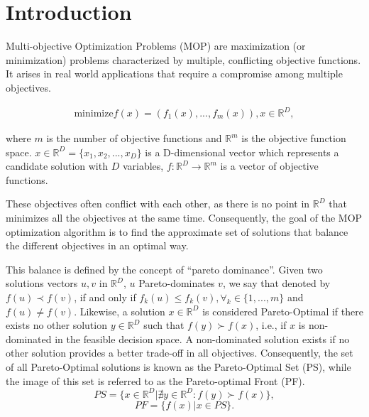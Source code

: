 \section{Introduction}

Multi-objective Optimization Problems (MOP) are maximization (or minimization) problems characterized by multiple, conflicting objective functions. It arises in real world applications that require a compromise among multiple objectives.



\vspace{-1em}
\begin{align}\label{min_problem}
\text{minimize} f(x) = (f_1(x), ..., f_{m}(x)), \text{$x \in \mathbb{R}^{D}$},
\end{align}

where $m$ is the number of objective functions and $\mathbb{R}^m$ is the objective function space. $x \in \mathbb{R}^{D} = \{x_1, x_2, ..., x_D\}$ is a D-dimensional vector which represents a candidate solution with ${D}$ variables, $f: \mathbb{R}^{D} \rightarrow \mathbb{R}^{m}$ is a vector of objective functions.

These objectives often conflict with each other, as there is no point in $\mathbb{R}^{D}$ that minimizes all the objectives at the same time. Consequently, the goal of the MOP optimization algorithm is to find the approximate set of solutions that balance the different objectives in an optimal way.

This balance is defined by the concept of ``pareto dominance''. Given two solutions vectors $u, v$ in $\mathbb{R}^{D}$, $u$  Pareto-dominates $v$, we say that denoted by $f(u) \prec f(v)$, if and only if $f_k(u) \leq f_k(v), \forall_k \in \{1,..., m\}$ and $ f(u) \neq f(v)$. Likewise, a solution $x \in \mathbb{R}^{D}$ is considered Pareto-Optimal if there exists no other solution $y \in \mathbb{R}^{D}$ such that $f(y) \succ f(x)$, i.e., if $x$ is non-dominated in the feasible decision space. A non-dominated solution exists if no other solution provides a better trade-off in all objectives. Consequently, the set of all Pareto-Optimal solutions is known as the Pareto-Optimal Set (PS), while the image of this set is referred to as the Pareto-optimal Front (PF).%
\begin{equation}
PS = \{x \in \mathbb{R}^{D} | \nexists y \in \mathbb{R}^{D} : f(y) \succ f(x)  \},
\end{equation}
\begin{equation}
PF = \{f(x) | x \in PS \}.
\end{equation}

